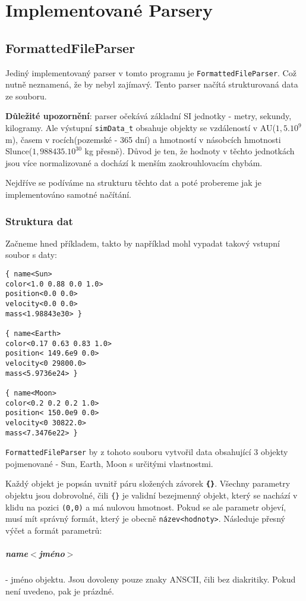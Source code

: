 \chapter{Implementované Parsery}
\section{FormattedFileParser}
Jediný implementovaný parser v tomto programu je \texttt{FormattedFileParser}. Což nutně neznamená, že by nebyl zajímavý. Tento parser načítá strukturovaná data ze souboru. 

\textbf{Důležité upozornění}: parser očekává základní SI jednotky - metry, sekundy, kilogramy. Ale výstupní \texttt{simData\_t} obsahuje objekty se vzdáleností v AU($ 1,5.10^9 $ m), časem v rocích(pozemské - 365 dní) a hmotností v násobcích hmotnosti Slunce($ 1,988435.10^{30} $ kg přesně). Důvod je ten, že hodnoty v těchto jednotkách jsou více normalizované a dochází k menším zaokrouhlovacím chybám.

Nejdříve se podíváme na strukturu těchto dat a poté probereme jak je implementováno samotné načítání.
\subsection{Struktura dat}
Začneme hned příkladem, takto by například mohl vypadat takový vstupní soubor s daty:
\begin{lstlisting}
{ name<Sun>
color<1.0 0.88 0.0 1.0>
position<0.0 0.0>
velocity<0.0 0.0>
mass<1.98843e30> }

{ name<Earth>
color<0.17 0.63 0.83 1.0>
position< 149.6e9 0.0>
velocity<0 29800.0>
mass<5.9736e24> }

{ name<Moon>
color<0.2 0.2 0.2 1.0>
position< 150.0e9 0.0>
velocity<0 30822.0>
mass<7.3476e22> }
\end{lstlisting}
\texttt{FormattedFileParser} by z tohoto souboru vytvořil data obsahující 3 objekty pojmenované - Sun, Earth, Moon s určitými vlastnostmi.

Každý objekt je popsán uvnitř páru složených závorek \textbf{\texttt{\{\}}}.
Všechny parametry objektu jsou dobrovolné, čili \lstinline|{}| je validní bezejmenný objekt, který se nachází v klidu na pozici \texttt{(0,0)} a má nulovou hmotnost. Pokud se ale parametr objeví, musí mít správný formát, který je obecně \texttt{název<hodnoty>}. Následuje přesný výčet a formát parametrů:
\paragraph{name$ < $jméno$ > $ } - jméno objektu. Jsou dovoleny pouze znaky ANSCII, čili bez diakritiky. Pokud není uvedeno, pak je prázdné.
